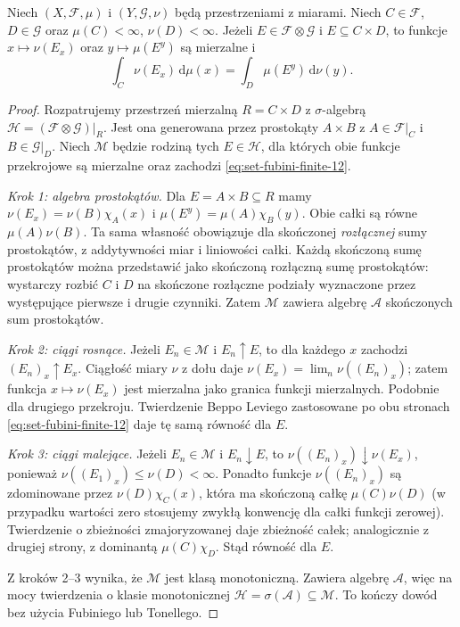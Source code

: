\begin{lemat}
\label{lem:finite-rectangle-sections-12}
Niech $(X,\mathcal F,\mu)$ i $(Y,\mathcal G,\nu)$
będą przestrzeniami z miarami.
Niech $C\in\mathcal F$, $D\in\mathcal G$ oraz
$\mu(C)<\infty$, $\nu(D)<\infty$. Jeżeli
$E\in\mathcal F\otimes\mathcal G$ i $E\subseteq C\times D$,
to funkcje $x\mapsto\nu(E_x)$ oraz
$y\mapsto\mu(E^y)$ są mierzalne i
\begin{equation}\label{eq:set-fubini-finite-12}
\int_C\nu(E_x)\,\mathrm d\mu(x)
=\int_D\mu(E^y)\,\mathrm d\nu(y).
\end{equation}
\end{lemat}
\begin{proof}
Rozpatrujemy przestrzeń mierzalną
$R=C\times D$ z $\sigma$-algebrą
$\mathcal H=(\mathcal F\otimes\mathcal G)|_R$.
Jest ona generowana przez prostokąty
$A\times B$ z $A\in\mathcal F|_C$ i
$B\in\mathcal G|_D$. Niech $\mathcal M$ będzie
rodziną tych $E\in\mathcal H$, dla których
obie funkcje przekrojowe są mierzalne oraz zachodzi
\eqref{eq:set-fubini-finite-12}.

\emph{Krok 1: algebra prostokątów.}
Dla $E=A\times B\subseteq R$ mamy
$\nu(E_x)=\nu(B)\chi_A(x)$ i
$\mu(E^y)=\mu(A)\chi_B(y)$. Obie całki
są równe $\mu(A)\nu(B)$.
Ta sama własność obowiązuje dla skończonej
\emph{rozłącznej} sumy prostokątów, z addytywności
miar i liniowości całki. Każdą skończoną sumę
prostokątów można przedstawić jako skończoną
rozłączną sumę prostokątów: wystarczy rozbić $C$
i $D$ na skończone rozłączne podziały wyznaczone
przez występujące pierwsze i drugie czynniki.
Zatem $\mathcal M$ zawiera algebrę $\mathcal A$
skończonych sum prostokątów.

\emph{Krok 2: ciągi rosnące.}
Jeżeli $E_n\in\mathcal M$ i $E_n\uparrow E$,
to dla każdego $x$ zachodzi $(E_n)_x\uparrow E_x$.
Ciągłość miary $\nu$ z dołu daje
$\nu(E_x)=\lim_n\nu((E_n)_x)$; zatem funkcja
$x\mapsto\nu(E_x)$ jest mierzalna jako granica
funkcji mierzalnych. Podobnie dla drugiego przekroju.
Twierdzenie Beppo Leviego zastosowane po obu stronach
\eqref{eq:set-fubini-finite-12} daje tę samą
równość dla $E$.

\emph{Krok 3: ciągi malejące.}
Jeżeli $E_n\in\mathcal M$ i $E_n\downarrow E$,
to $\nu((E_n)_x)\downarrow\nu(E_x)$, ponieważ
$\nu((E_1)_x)\le\nu(D)<\infty$. Ponadto funkcje
$\nu((E_n)_x)$ są zdominowane przez
$\nu(D)\chi_C(x)$, która ma skończoną
całkę $\mu(C)\nu(D)$ (w przypadku wartości zero
stosujemy zwykłą konwencję dla całki funkcji zerowej).
Twierdzenie o zbieżności zmajoryzowanej daje zbieżność
całek; analogicznie z drugiej strony, z dominantą
$\mu(C)\chi_D$. Stąd równość dla $E$.

Z kroków 2--3 wynika, że $\mathcal M$ jest klasą
monotoniczną. Zawiera algebrę $\mathcal A$, więc
na mocy twierdzenia o klasie monotonicznej
$\mathcal H=\sigma(\mathcal A)\subseteq\mathcal M$.
To kończy dowód bez użycia Fubiniego lub Tonellego.
\end{proof}

